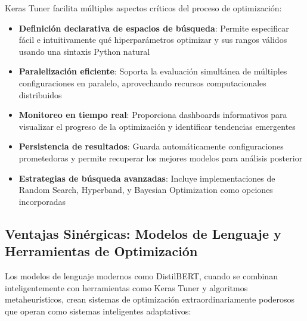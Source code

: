 Keras Tuner facilita múltiples aspectos críticos del proceso de optimización:

\begin{itemize}
    \item \textbf{Definición declarativa de espacios de búsqueda}: Permite especificar fácil e intuitivamente qué hiperparámetros optimizar y sus rangos válidos usando una sintaxis Python natural
    \item \textbf{Paralelización eficiente}: Soporta la evaluación simultánea de múltiples configuraciones en paralelo, aprovechando recursos computacionales distribuidos
    \item \textbf{Monitoreo en tiempo real}: Proporciona dashboards informativos para visualizar el progreso de la optimización y identificar tendencias emergentes
    \item \textbf{Persistencia de resultados}: Guarda automáticamente configuraciones prometedoras y permite recuperar los mejores modelos para análisis posterior
    \item \textbf{Estrategias de búsqueda avanzadas}: Incluye implementaciones de Random Search, Hyperband, y Bayesian Optimization como opciones incorporadas
\end{itemize}

\subsection{Ventajas Sinérgicas: Modelos de Lenguaje y Herramientas de Optimización}

Los modelos de lenguaje modernos como DistilBERT, cuando se combinan inteligentemente con herramientas como Keras Tuner y algoritmos metaheurísticos, crean sistemas de optimización extraordinariamente poderosos que operan como sistemas inteligentes adaptativos:

